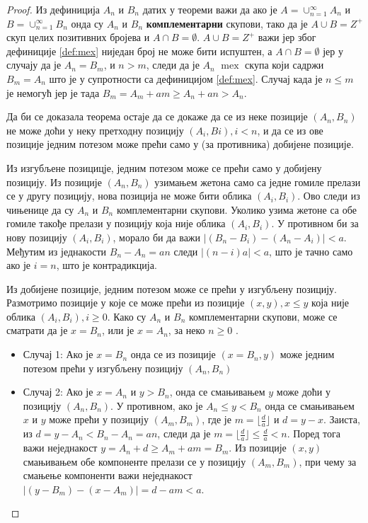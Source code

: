 \documentclass[a4paper]{article}
\DeclareMathOperator{\mex}{mex}
\begin{document}
\begin{proof}
	
	Из дефиниција $ A_{n} $ и $ B_{n} $ датих у теореми важи да ако је $ A = \cup_{n=1}^{\infty} A_{n} $ и  $ B = \cup_{n=1}^{\infty} B_{n} $ онда су $ A_{n} $ и $ B_{n} $ \textbf{комплементарни} скупови, тако да је $ A \cup B = Z^{+} $ скуп целих позитивних бројева  и $ A \cap B = \emptyset $. 
	$ A \cup B = Z^{+} $ важи јер због дефиниције \ref{def:mex} ниједан број не може бити испуштен, а $ A \cap B = \emptyset $ јер у случају да је $ A_{n} = B_{m} $, и $ n > m $, следи да је $ A_{n} $ $ \mex $ скупа који садржи $ B_{m} = A_{n} $ што је у супротности са дефиницијом \ref{def:mex}. Случај када је $ n \leq m $ је немогућ јер је тада $ B_{m} = A_{m} + am \geq  A_{n} + an > A_{n} $. 
	
	Да би се доказала теорема остаје да се докаже да се из неке позиције $ (A_{n}, B_{n}) $ не може доћи у неку претходну позицију $ (A_{i}, B{i}), i < n $, и да се из ове позиције једним потезом може прећи само у (за противника) добијене позиције.
	
	Из изгубљене позицицје, једним потезом може се прећи само у добијену позицију. Из позиције $ (A_{n}, B_{n}) $ узимањем жетона само са једне гомиле прелази се у другу позицију, нова позиција не може бити облика $ (A_{i}, B_{i}) $. Ово следи из чињенице да су  $ A_{n} $ и $ B_{n} $ комплементарни скупови. Уколико узима жетоне са обе гомиле такође прелази у позицију која није облика $ (A_{i}, B_{i}) $. У противном би за нову позицију $ (A_{i}, B_{i}) $, морало би да важи $ |(B_{n} - B_{i}) - (A_{n}-A_{i})| < a $. Међутим из једнакости $ B_{n} - A_{n} = an $ следи $ |(n-i)a| < a $, што је тачно само ако је $ i = n $, што је контрадикција. 
	
	Из добијене позиције, једним потезом може се прећи у изгубљену позицију.
	Размотримо позиције у које се може прећи из позиције $ (x, y), x \le y $ која није облика $ (A_{i}, B_{i}), i \ge 0 $. Како су $ A_{n} $ и $ B_{n} $ комплементарни скупови, може се сматрати да је $ x = B_{n} $, или је $ x = A_{n} $, за неко $ n \ge 0 $ .
	\begin{itemize}
		\item \label{case:slucaj1} Случај 1: Ако је $ x = B_{n} $ онда се из позиције $ (x = B_{n}, y) $ може једним потезом прећи у изгубљену позицију $ (A_{n}, B_{n}) $ 
		\item \label{case:slucaj2} Случај 2: Ако је $ x = A_{n} $ и $ y > B_{n} $, онда се смањивањем $ y $ може доћи у позицију $ (A_{n}, B_{n}) $. У противном, ако је $ A_{n} \le y < B_{n} $ онда се смањивањем $ x $ и $ y $ може прећи у позицију $ (A_{m}, B_{m}) $, где је $ m = \lfloor \frac{d}{a} \rfloor $ и $ d = y - x $. Заиста, из $ d = y - A_{n} < B_{n} - A_{n} = an $, следи да је  $ m = \lfloor \frac{d}{a} \rfloor \le \frac{d}{a} < n $. Поред тога важи неједнакост $ y = A_{n} + d \ge A_{m} + am = B_m $. Из позиције $ (x, y) $ смањивањем обе компоненте прелази се у позицију $ (A_{m}, B_{m}) $, при чему за смањење компоненти важи неједнакост $ |(y - B_{m}) - (x - A_{m})| = d - am < a $.
	\end{itemize}
	
\end{proof}
\end{document}
